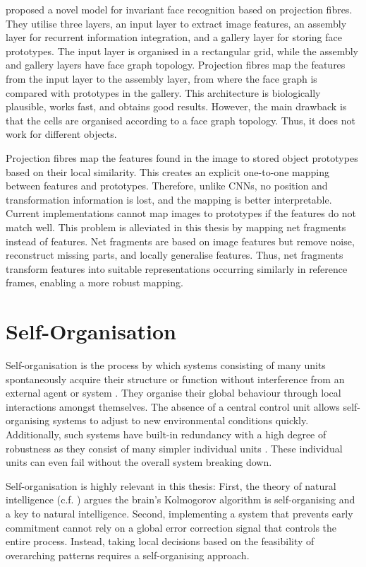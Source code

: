  proposed a novel model for invariant face recognition based on projection fibres.
They utilise three layers, an input layer to extract image features, an assembly layer for recurrent information integration, and a gallery layer for storing face prototypes.
The input layer is organised in a rectangular grid, while the assembly and gallery layers have face graph topology.
Projection fibres map the features from the input layer to the assembly layer, from where the face graph is compared with prototypes in the gallery.
This architecture is biologically plausible, works fast, and obtains good results. 
However, the main drawback is that the cells are organised according to a face graph topology. Thus, it does not work for different objects. 

Projection fibres map the features found in the image to stored object prototypes based on their local similarity. This creates an explicit one-to-one mapping between features and prototypes. Therefore, unlike CNNs, no position and transformation information is lost, and the mapping is better interpretable.
Current implementations cannot map images to prototypes if the features do not match well.
This problem is alleviated in this thesis by mapping net fragments  instead of features.
Net fragments are based on image features but remove noise, reconstruct missing parts, and locally generalise features. Thus, net fragments transform features into suitable representations occurring similarly in reference frames, enabling a more robust mapping.

\section{Self-Organisation}
Self-organisation is the process by which systems consisting of many units spontaneously acquire their structure or function without interference from an external agent or system .
They organise their global behaviour through local interactions amongst themselves.
The absence of a central control unit allows self-organising systems to adjust to new environmental conditions quickly.
Additionally, such systems have built-in redundancy with a high degree of robustness as they consist of many simpler individual units .
These individual units can even fail without the overall system breaking down.

Self-organisation is highly relevant in this thesis: First, the theory of natural intelligence (c.f. ) argues the brain's Kolmogorov algorithm is self-organising and a key to natural intelligence. Second, implementing a system that prevents early commitment cannot rely on a global error correction signal that controls the entire process. Instead, taking local decisions based on the feasibility of overarching patterns requires a self-organising approach.

